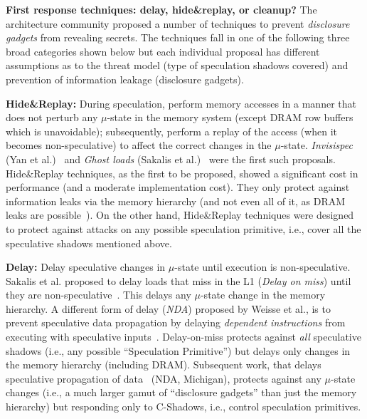 \noindent \textbf{First response techniques: delay, hide\&replay, or cleanup?}
The architecture community proposed a number of techniques to prevent \emph{disclosure gadgets} from revealing secrets. The techniques fall in one of the following three broad categories shown below but each individual proposal has different assumptions as to the threat model (type of speculation shadows covered) and prevention of information leakage (disclosure gadgets).
\squishlist
\item{\textbf{Hide\&Replay:}} During speculation, perform memory accesses in a manner that does not perturb any $\mu$-state in the memory system (except DRAM row buffers which is unavoidable); subsequently, perform a replay of the access (when it becomes non-speculative) to affect the correct changes in the $\mu$-state. \emph{Invisispec} (Yan et al.)~\cite{yan_invisispec:MICRO2018} and \emph{Ghost loads} (Sakalis et al.)~\cite{sakalis2019ghost} were the first such proposals. 
Hide\&Replay techniques, as the first to be proposed, showed a significant cost in performance (and a moderate implementation cost). They only protect against information leaks via the memory hierarchy (and not even all of it, as DRAM leaks are possible~\cite{pessl2016drama}). On the other hand, Hide\&Replay techniques were designed to protect against attacks on any possible speculation primitive, i.e., cover all the speculative shadows mentioned above. 
\item{\textbf{Delay:}} Delay speculative changes in $\mu$-state until execution is non-speculative. Sakalis et al. proposed to delay loads that miss in the L1 (\emph{Delay on miss}) until they are non-speculative~\cite{sakalis2019efficient}. This delays any $\mu$-state change in the memory hierarchy. A different form of delay (\emph{NDA}) proposed by Weisse et al., is to prevent speculative data propagation by delaying \emph{dependent instructions} from executing with speculative inputs~\cite{weisse2019nda}. Delay-on-miss protects against \emph{all} speculative shadows (i.e., any possible ``Speculation Primitive'') but delays only changes in the memory hierarchy (including DRAM). Subsequent work, that delays speculative propagation of data~\cite{weisse2019nda} (NDA, Michigan), protects against any $\mu$-state changes (i.e., a much larger gamut of ``disclosure gadgets'' than just the memory hierarchy) but responding only to C-Shadows, i.e., control speculation primitives.

